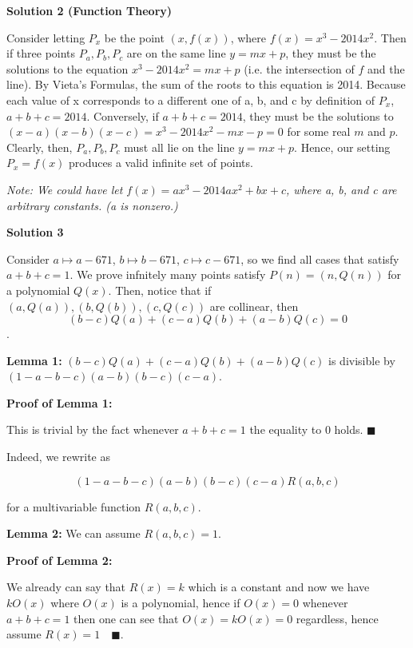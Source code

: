 \begin{enumerate}
 



\textbf{Solution 2 (Function Theory)}

Consider letting $P_x$ be the point $(x, f(x))$, where $f(x) = x^3 - 2014x^2$. Then if three points $P_a, P_b, P_c$ are on the same line $y = mx + p$, they must be the solutions to the equation $x^3 - 2014x^2 = mx + p$ (i.e. the intersection of $f$ and the line). By Vieta's Formulas, the sum of the roots to this equation is 2014. Because each value of x corresponds to a different one of a, b, and c by definition of $P_x$, $a + b + c = 2014$. Conversely, if $a + b + c = 2014$, they must be the solutions to $(x-a)(x-b)(x-c) = x^3 - 2014x^2 - mx - p = 0$ for some real $m$ and $p$. Clearly, then, $P_a, P_b, P_c$ must all lie on the line $y = mx + p$. Hence, our setting $P_x = f(x)$ produces a valid infinite set of points.

 \textit{Note: We could have let $f(x) = ax^3 - 2014ax^2 + bx + c$, where a, b, and c are arbitrary constants. (a is nonzero.)}

 



\textbf{Solution 3}

Consider $a \mapsto a-671$, $b \mapsto b-671$, $c \mapsto c-671$, so we find all cases that satisfy $a+b+c = 1$. We prove infnitely many points satisfy $P(n) = (n, Q(n))$ for a polynomial $Q(x)$. Then, notice that if $(a,Q(a)), (b,Q(b)), (c,Q(c))$ are collinear, then
 \[(b-c)Q(a) + (c-a)Q(b) + (a-b)Q(c) = 0\].

 \textbf{Lemma 1:} $(b-c)Q(a) + (c-a)Q(b) + (a-b)Q(c)$ is divisible by $(1-a-b-c)(a-b)(b-c)(c-a)$.

 \textbf{Proof of Lemma 1:}

 This is trivial by the fact whenever $a+b+c = 1$ the equality to 0 holds. $\blacksquare$

 Indeed, we rewrite as

 
 \[(1-a-b-c)(a-b)(b-c)(c-a)R(a,b,c)\]

 for a multivariable function $R(a,b,c)$.

 \textbf{Lemma 2:} We can assume $R(a,b,c) = 1$.

 \textbf{Proof of Lemma 2:}

 We already can say that $R(x) = k$ which is a constant and now we have $kO(x)$ where $O(x)$ is a polynomial, hence if $O(x) = 0$ whenever $a+b+c = 1$ then one can see that $O(x) = kO(x) = 0$ regardless, hence assume $R(x) = 1 \quad \blacksquare$.


\end{enumerate}
